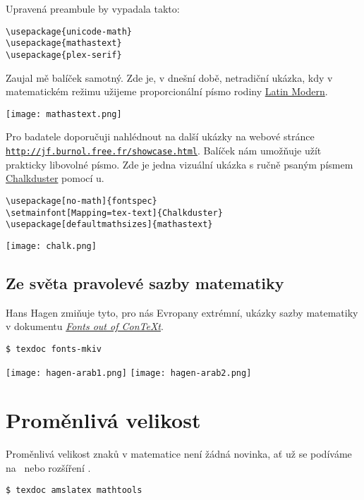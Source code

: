 Upravená preambule by vypadala takto:

\begin{lstlisting}
\usepackage{unicode-math}
\usepackage{mathastext}
\usepackage{plex-serif}
\end{lstlisting}


Zaujal mě balíček \href{https://ctan.org/pkg/mathastext}{} samotný. Zde je, v dnešní době, netradiční ukázka, kdy v matematickém režimu užijeme proporcionální písmo rodiny 
\href{https://tug.org/FontCatalogue/latinmodernroman/}{Latin Modern}.

\noindent
\texttt{[image: mathastext.png]}


Pro badatele doporučuji nahlédnout na další ukázky na webové stránce
\href{http://jf.burnol.free.fr/showcase.html}{\tt http://jf.burnol.free.fr/showcase.html}.
Balíček nám umožňuje užít prakticky libovolné písmo. Zde je jedna vizuální ukázka s ručně psaným písmem 
\href{https://www.ffonts.net/Chalkduster.font}{Chalkduster}
pomocí \XeLaTeX u.

\begin{lstlisting}
\usepackage[no-math]{fontspec}
\setmainfont[Mapping=tex-text]{Chalkduster}
\usepackage[defaultmathsizes]{mathastext}
\end{lstlisting}

\noindent
\hfil
\texttt{[image: chalk.png]}




\subsection{Ze světa pravolevé sazby matematiky}

Hans Hagen zmiňuje tyto, pro nás Evropany extrémní, ukázky sazby matematiky v dokumentu \href{http://www.pragma-ade.nl/general/manuals/fonts-mkiv.pdf}{\textit{Fonts out of Con\TeX t}}.
\begin{lstlisting}
$ texdoc fonts-mkiv
\end{lstlisting}

\noindent\hfil
\texttt{[image: hagen-arab1.png]}\hskip1cm
\texttt{[image: hagen-arab2.png]}




\section{Proměnlivá velikost}
Proměnlivá velikost znaků v matematice není žádná novinka, ať už se podíváme na \href{https://ctan.org/pkg/amstex}{\AMSTeX}\ nebo rozšíření
\href{https://ctan.org/pkg/mathtools}{}.
\begin{lstlisting}
$ texdoc amslatex mathtools
\end{lstlisting}


